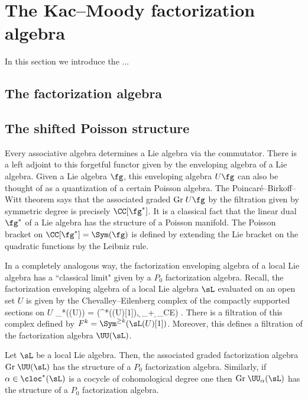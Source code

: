 \section{The Kac--Moody factorization algebra}

In this section we introduce the ...

\subsection{The factorization algebra}


\subsection{The shifted Poisson structure}

Every associative algebra determines a Lie algebra via the commutator. 
There is a left adjoint to this forgetful functor given by the enveloping algebra of a Lie algebra. 
Given a Lie algebra $\fg$, this enveloping algebra $U \fg$ can also be thought of as a quantization of a certain Poisson algebra.
The Poincar\'{e}--Birkoff--Witt theorem says that the associated graded ${\rm Gr} \; U \fg$ by the filtration given by symmetric degree is precisely $\CC[\fg^*]$.
It is a classical fact that the linear dual $\fg^*$ of a Lie algebra has the structure of a Poisson manifold. 
The Poisson bracket on $\CC[\fg^*] = \Sym(\fg)$ is defined by extending the Lie bracket on the quadratic functions by the Leibniz rule. 

In a completely analogous way, the factorization enveloping algebra of a local Lie algebra has a ``classical limit" given by a $P_0$ factorization algebra. 
Recall, the factorization enveloping algebra of a local Lie algebra $\sL$ evaluated on an open set $U$ is given by the Chevalley--Eilenberg complex of the compactly supported sections on $U$
\ben
\clieu_*(\sL(U)) = \left(\Sym^*(\sL(U)[1]), \d_\sL + \d_{CE}\right) .
\een
There is a filtration of this complex defined by $F^k = \Sym^{\geq k} (\sL (U)[1])$. 
Moreover, this defines a filtration of the factorization algebra $\UU(\sL)$. 

\begin{lem} Let $\sL$ be a local Lie algebra. 
Then, the associated graded factorization algebra ${\rm Gr} \; \UU(\sL)$ has the structure of a $P_0$ factorization algebra. 
Similarly, if $\alpha \in \cloc^*(\sL)$ is a cocycle of cohomological degree one then ${\rm Gr} \; \UU_\alpha(\sL)$ has the structure of a $P_0$ factorization algebra.
\end{lem}

